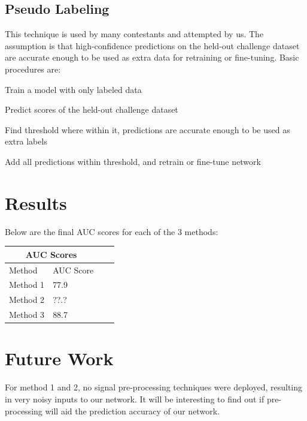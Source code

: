 \documentclass[10pt,twocolumn,letterpaper]{article}
\newenvironment{alt_enumerate}
{ \begin{enumerate}
		\setlength{\itemsep}{1pt}
		\setlength{\parskip}{1pt}
		\setlength{\parsep}{1pt} }
	{ \end{itemize} }
\begin{document}
\subsection{Pseudo Labeling}

This technique is used by many contestants and attempted by us. The
assumption is that high-confidence predictions on the held-out challenge
dataset are accurate enough to be used as extra data for retraining or
fine-tuning. Basic procedures are:

\begin{alt_enumerate}
	\item{Train a model with only labeled data}
	\item{Predict scores of the held-out challenge dataset}
	\item{Find threshold where within it, predictions are accurate enough to
		be used as extra labels}
	\item{Add all predictions within threshold, and retrain or fine-tune
		network}
\end{alt_enumerate}

\section{Results}

Below are the final AUC scores for each of the 3 methods:\\

\begin{tabular}{ |p{2cm}|p{2cm}|p{2cm}|p{2cm}| }
	\hline
	\multicolumn{2}{|c|}{AUC Scores}\\
	\hline
	Method & AUC Score\\
	\hline
	Method 1 & 77.9\\
	Method 2 & ??.?\\
	Method 3 & 88.7\\
	\hline
\end{tabular}

\section{Future Work}

For method 1 and 2, no signal pre-processing techniques were deployed,
resulting in very noisy inputs to our network. It will be interesting to
find out if pre-processing will aid the prediction accuracy of our network.
\end{document}
